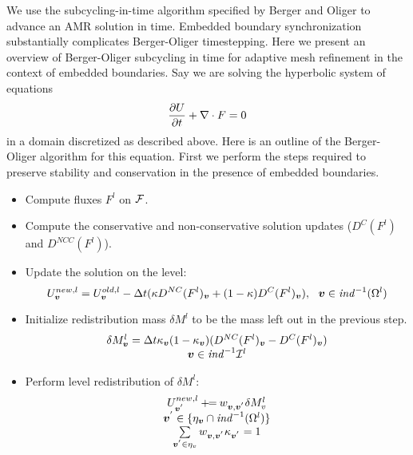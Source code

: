 We use the subcycling-in-time algorithm specified by
Berger and Oliger  \cite{bergerOliger:1984} to advance
an AMR solution in time.
Embedded boundary synchronization substantially complicates
Berger-Oliger timestepping.
Here we present an overview of
Berger-Oliger subcycling in time for adaptive mesh refinement in the
context of embedded boundaries.
Say we are solving the hyperbolic system of equations
\begin{equation}
\frac{\partial U}{\partial t} + \nabla \cdot F = 0
\end{equation}
in a domain discretized as described above.
Here is an outline of the Berger-Oliger algorithm for this equation.
First we perform the steps required to preserve stability and
conservation in the presence of embedded boundaries.
\begin{itemize}
\item Compute fluxes $F^l$ on $ {\cal F}$.
\item Compute the conservative and non-conservative solution updates
   ($D^{C}(F^l)$ and $D^{NCC}(F^l)$).
\item Update the solution on the level:
\begin{equation}
  U^{new, l}_{\boldsymbol{v}} = U^{old, l}_{\boldsymbol{v}} - \Delta t(\kappa
  D^{NC}(F^l)_{\boldsymbol{v}} +  (1-\kappa)D^{C}(F^l)_{\boldsymbol{v}}),
  ~~{\boldsymbol{v}} \in {\it ind}^{-1}(\Omega^l)
\end{equation}
\item Initialize redistribution mass $\delta M^l$ to be the mass left
out in the previous step.
\begin{equation}
\begin{array}{c}
\delta M^l_{\boldsymbol{v}} = \Delta t
\kappa_{\boldsymbol{v}}(1-\kappa_{\boldsymbol{v}})(D^{NC}(F^l)_{\boldsymbol{v}}-D^{C}(F^l)_{\boldsymbol{v}})
\\
 {\boldsymbol{v}} \in {\it ind}^{-1}{\cal I}^l
\end{array}
\end{equation}
\item Perform level redistribution of $\delta M^l$:
\begin{equation}
\begin{array}{c}
U^{new,l}_{{\boldsymbol{v}^{'}}} \mathbin{+\mkern-7mu=} w_{{\boldsymbol{v}}, {\boldsymbol{v}^{'}}} \delta M^l_v \\
{\boldsymbol{v}^{'}} \in \{ {\eta}_{\boldsymbol{v}} \cap {\it ind}^{-1}(\Omega^l) \} \\
\sum\limits_{{\boldsymbol{v}^{'}} \in {\eta}_v} w_{{\boldsymbol{v}},{\boldsymbol{v}^{'}}}\kappa_{{\boldsymbol{v}^{'}}}=1 
\end{array}
\label{eqn::redisteqn2}
\end{equation}
\end{itemize}
